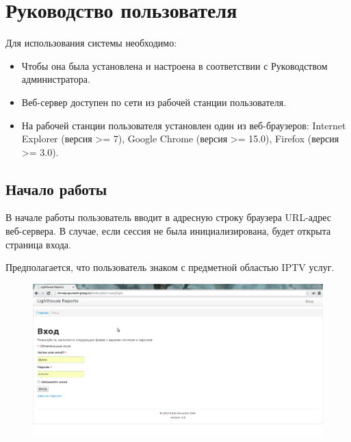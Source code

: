 
\section{Руководство пользователя}

Для использования системы необходимо:
\begin{itemize}
\item{
 Чтобы она была установлена и настроена в соответствии с Руководством администратора.
}
\item{
 Веб-сервер доступен по сети из рабочей станции пользователя.
}
\item{
 На рабочей станции пользователя установлен один из веб-браузеров: 
Internet Explorer (версия >= 7), Google Chrome (версия >= 15.0), Firefox (версия >= 3.0).
}
\end{itemize}


\subsection*{Начало работы}

В начале работы пользователь вводит в адресную строку браузера URL-адрес веб-сервера.
В случае, если сессия не была инициализирована, будет открыта страница входа.

Предполагается, что пользователь знаком с предметной областью IPTV услуг.

\begin{figure}[!ht]
\begin{center}
\hspace*{-1cm} \includegraphics[scale=0.35, trim=0mm 0mm 0mm 10mm, clip]{../resources/screens/login.png}
\end{center}
\end{figure}

